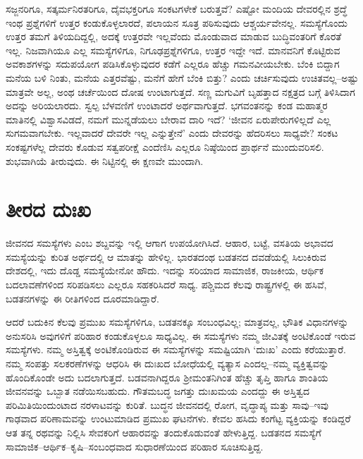 ಸಜ್ಜನರಿಗೂ, ಸತ್ಕರ್ಮನಿರತರಿಗೂ, ದೈವಭಕ್ತರಿಗೂ ಸಂಕಟಗಳೇಕೆ ಬರುತ್ತವೆ? ಎಷ್ಟೋ ಮಂದಿಯ ದೇವರಲ್ಲಿನ ಶ್ರದ್ಧೆ ಇಂಥ ಪ್ರಶ್ನೆಗಳಿಗೆ ಉತ್ತರ ಕಂಡುಕೊಳ್ಳಲಾರದೆ, ಪಲಾಯನ ಸೂತ್ರ ಪಠಿಸುವುದು ಆಶ್ಚರ್ಯವೇನಲ್ಲ. ಸಮಸ್ಯೆಗೊಂದು ಉತ್ತರ ತಮಗೆ ತಿಳಿಯದಿದ್ದಲ್ಲಿ, ಅದಕ್ಕೆ ಉತ್ತರವೇ ಇಲ್ಲವೆಂದು ಮೊಂಡುವಾದ ಮಾಡುವ ಬುದ್ಧಿವಂತರಿಗೆ ಕೊರತೆ ಇಲ್ಲ. ನಿಜವಾಗಿಯೂ ಎಲ್ಲ ಸಮಸ್ಯೆಗಳಿಗೂ, ನಿಗೂಢಪ್ರಶ್ನೆಗಳಿಗೂ, ಉತ್ತರ ಇದ್ದೇ ಇದೆ. ಮಾನವನಿಗೆ ಕೊಟ್ಟಿರುವ ಅವಕಾಶಗಳನ್ನು ಸದುಪಯೋಗ ಪಡಿಸಿಕೊಳ್ಳುವುದರ ಕಡೆಗೆ ಎಲ್ಲರೂ ಹೆಚ್ಚು ಗಮನವೀಯಬೇಕು. ಬೆಂಕಿ ಬಿದ್ದಾಗ ಮನೆಯ ಬಳಿ ನಿಂತು, ಮನೆಯ ಎತ್ತರವೆಷ್ಟು, ಮನೆಗೆ ಹೇಗೆ ಬೆಂಕಿ ಬಿತ್ತು? ಎಂದು ಚರ್ಚಿಸುವುದು ಉಚಿತವಲ್ಲ–ಅಷ್ಟು ಮಾತ್ರವೇ ಅಲ್ಲ, ಅಂಥ ಚರ್ಚೆಯಿಂದ ದೋಷ ಉಂಟಾಗುತ್ತದೆ. ಸಣ್ಣ ಮಗುವಿಗೆ ಬೃಹತ್ತಾದ ನಕ್ಷತ್ರದ ಬಗ್ಗೆ ತಿಳಿಸಿದಾಗ ಅದನ್ನು ಅರಿಯಲಾರದು. ಸ್ವಲ್ಪ ಬೆಳವಣಿಗೆ ಉಂಟಾದರೆ ಅರ್ಥವಾಗುತ್ತದೆ. ಭಗವಂತನನ್ನು ಕಂಡ ಮಹಾತ್ಮರ ಮಾತಿನಲ್ಲಿ ವಿಶ್ವಾಸವಿಡದೆ, ನಮಗೆ ಮುನ್ನಡೆಯಲು ಬೇರಾವ ದಾರಿ ಇದೆ? ‘ಜೀವನ ಏರುಪೇರುಗಳಿಲ್ಲದೆ ಎಲ್ಲ ಸುಗಮವಾಗಬೇಕು. ಇಲ್ಲವಾದರೆ ದೇವರೇ ಇಲ್ಲ ಎನ್ನುತ್ತೇನೆ’ ಎಂದು ದೇವರನ್ನು ಹೆದರಿಸಲು ಸಾಧ್ಯವೇ? ಸಂಕಟ ಸಂಕಷ್ಟಗಳೆಲ್ಲ ದೇವರು ಕೊಡುವ ಸತ್ವಪರೀಕ್ಷೆ ಎಂದೆಣಿಸಿ ಎಲ್ಲರೂ ನಿಷ್ಠೆಯಿಂದ ಪ್ರಾರ್ಥನೆ ಮುಂದುವರಿಸಲಿ. ಶುಭವಾಗಿಯೆ ತೀರುವುದು. ಈ ನಿಟ್ಟಿನಲ್ಲಿ ಈ ಕ್ಷಣವೇ ಮುಂದಾಗಿ.


\section*{ತೀರದ ದುಃಖ}


ಜೀವನದ ಸಮಸ್ಯೆಗಳು ಎಂಬ ಶಬ್ದವನ್ನು ಇಲ್ಲಿ ಆಗಾಗ ಉಪಯೋಗಿಸಿದೆ. ಆಹಾರ, ಬಟ್ಟೆ, ವಸತಿಯ ಅಭಾವದ ಸಮಸ್ಯೆಯನ್ನು ಕುರಿತ ಅರ್ಥದಲ್ಲಿ ಆ ಮಾತನ್ನು ಹೇಳಿಲ್ಲ. ಭಾರತದಂಥ ಬಡತನದ ದವಡೆಯಲ್ಲಿ ಸಿಲುಕಿರುವ ದೇಶದಲ್ಲಿ, ಇದು ದೊಡ್ಡ ಸಮಸ್ಯೆಯೇನೋ ಹೌದು. ಇದನ್ನು ಸರಿಯಾದ ಸಾಮಾಜಿಕ, ರಾಜಕೀಯ, ಆರ್ಥಿಕ ಬದಲಾವಣೆಗಳಿಂದ ಸರಿಪಡಿಸಲು ಎಲ್ಲರೂ ಸಹಕರಿಸಿದರೆ ಸಾಧ್ಯ. ಪಶ್ಚಿಮದ ಕೆಲವು ರಾಷ್ಟ್ರಗಳಲ್ಲಿ ಈ ಹಸಿವೆ, ಬಡತನಗಳನ್ನು ಈ ರೀತಿಗಳಿಂದ ದೂರಮಾಡಿದ್ದಾರೆ.

ಆದರೆ ಬದುಕಿನ ಕೆಲವು ಪ್ರಮುಖ ಸಮಸ್ಯೆಗಳಿಗೂ, ಬಡತನಕ್ಕೂ ಸಂಬಂಧವಿಲ್ಲ; ಮಾತ್ರವಲ್ಲ, ಭೌತಿಕ ವಿಧಾನಗಳನ್ನು ಅನುಸರಿಸಿ ಅವುಗಳಿಗೆ ಪರಿಹಾರ ಕಂಡುಕೊಳ್ಳಲೂ ಸಾಧ್ಯವಿಲ್ಲ. ಈ ಸಮಸ್ಯೆಗಳು ನಮ್ಮ ಜೀವಿತಕ್ಕೆ ಅಂಟಿಕೊಂಡೆ ಇರುವ ಸಮಸ್ಯೆಗಳು. ನಮ್ಮ ಅಸ್ತಿತ್ವಕ್ಕೆ ಅಂಟಿ\-ಕೊಂಡಿರುವ ಈ ಸಮಸ್ಯೆಗಳನ್ನು ಸಮಷ್ಟಿಯಾಗಿ ‘ದುಃಖ’ ಎಂದು ಕರೆಯುತ್ತಾರೆ. ನಮ್ಮ ಸಂಪತ್ತು ಸಲಕರಣೆಗಳನ್ನು ಆಧರಿಸಿ ಈ ದುಃಖದ ಬೋಧೆಯಲ್ಲಿ ವ್ಯತ್ಯಾಸ ಎಂದಲ್ಲ–ನಮ್ಮ ವ್ಯಕ್ತಿತ್ವವನ್ನು ಹೊಂದಿಕೊಂಡೇ ಅದು ಬದಲಾಗುತ್ತದೆ. ಬಡವನಾಗಿದ್ದರೂ ಶ‍್ರೀಮಂತನಿಗಿಂತ ಹೆಚ್ಚು ತೃಪ್ತಿ ಹಾಗೂ ಶಾಂತಿಯ ಜೀವನವನ್ನು ಒಬ್ಬಾತ ನಡೆಯಿಸಬಹುದು. ಗೌತಮಬದ್ಧ ಜಗತ್ತು ದುಃಖಮಯ ಎಂದದ್ದು ಈ ಅಸ್ತಿತ್ವದ ಪರಿಮಿತಿಯಿಂದುಂಟಾದ ನರಳಾಟವನ್ನು ಕುರಿತೆ. ಬುದ್ಧನ ಜೀವನದಲ್ಲಿ ರೋಗ, ವೃದ್ಧಾಪ್ಯ ಮತ್ತು ಸಾವು–ಇವು ಗಾಢವಾದ ಪರಿಣಾಮವನ್ನು ಉಂಟುಮಾಡಿದ ಪ್ರಮುಖ ಘಟನೆಗಳು. ಕೇವಲ ಹಸಿದು ಕಂಗೆಟ್ಟ ವ್ಯಕ್ತಿಯನ್ನು ಕಂಡಿದ್ದರೆ ಆತ ತನ್ನ ರಥವನ್ನು ನಿಲ್ಲಿಸಿ ಸೇವಕರಿಗೆ ಆಹಾರವನ್ನು ತಂದುಕೊಡುವಂತೆ ಹೇಳುತ್ತಿದ್ದ. ಬಡತನದ ಸಮಸ್ಯೆಗೆ ಸಾಮಾಜಿಕ–ಆರ್ಥಿಕ–ಕೃಷಿ–ಸಂಬಂಧವಾದ ಸುಧಾರಣೆಯಿಂದ ಪರಿಹಾರ ಸೂಚಿಸುತ್ತಿದ್ದ.

